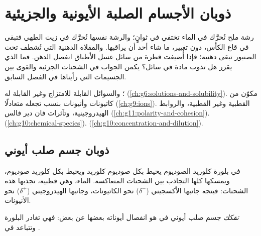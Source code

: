 \chapter{ذوبان الأجسام الصلبة الأيونية والجزيئية}\label{ch:g11:dissolution}

رشة ملح تُحرَّك في الماء تختفي في ثوانٍ؛ والرشة نفسها تُحرَّك في زيت الطهي
فتبقى في قاع الكأس، دون تغيير، ما شاء أحد أن يراقبها. والمقلاة الدهنية التي
تُشطف تحت الصنبور تبقى دهنية؛ فإذا أُضيفت قطرة من سائل غسل الأطباق انفصل الدهن.
فما الذي يقرر هل تذوب مادة في سائل؟ يكمن الجواب في الشحنات الجزئية والقوى بين
الجسيمات التي رأيناها في الفصل السابق.

\begin{recall}
؛ والسوائل القابلة للامتزاج وغير القابلة له
(\cref{ch:g6:solutions-and-solubility}).  مكوّن من كاتيونات
وأنيونات بنسب تجعله متعادلًا (\cref{ch:g9:ions}).  القطبية وغير
القطبية، والروابط الهيدروجينية، وتآثرات فان دير فالس
(\cref{ch:g11:polarity-and-cohesion}). 
(\cref{ch:g10:chemical-species}). 
(\cref{ch:g10:concentration-and-dilution}).
\end{recall}

\section{ذوبان جسم صلب أيوني}

في بلورة كلوريد الصوديوم يحيط بكل  صوديوم   كلوريد 
ويحيط بكل  كلوريد  صوديوم، ويمسكها كلها التجاذب بين الشحنات المتعاكسة.
 الماء، وهي قطبية، تجذبها هذه الشحنات: فيتجه جانبها الأكسجيني
($\delta^-$) نحو الكاتيونات، وجانبها الهيدروجيني ($\delta^+$) نحو الأنيونات.

\begin{definition}[التفكك]\label{def:g11:dissolution:dissociation}
\emph{تفكك} جسم صلب أيوني في  هو انفصال أيوناته بعضها عن
بعض: فهي تغادر البلورة وتتباعد في .
\end{definition}

